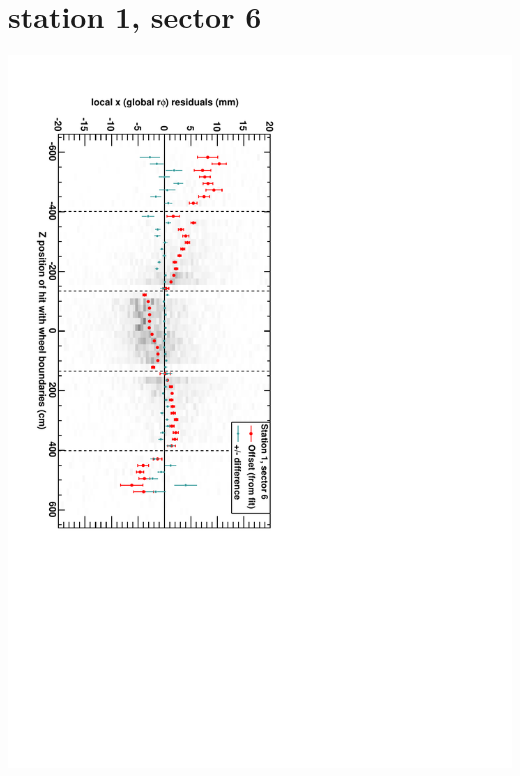 \documentclass[compress]{beamer}
\begin{document}
\section*{station 1, sector 6}
\begin{frame} \vfill \mbox{\hspace{-1 cm}\includegraphics[height=1.2\linewidth, angle=90]{DTrphiVsZ_st1_sr06.pdf}} \end{frame}
\end{document}
